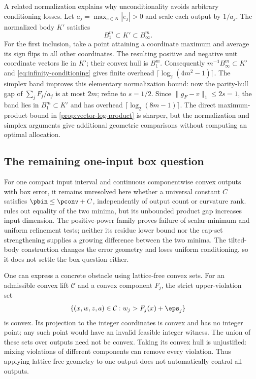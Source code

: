 A related normalization explains why unconditionality avoids arbitrary
conditioning losses. Let $a_j=\max_{e\in K}|e_j|>0$ and scale each
output by $1/a_j$. The normalized body $K'$ satisfies
\[
 B_1^m\subset K'\subset B_\infty^m.
\]
For the first inclusion, take a point attaining a coordinate maximum and
average its sign flips in all other coordinates. The resulting positive
and negative unit coordinate vectors lie in $K'$; their convex hull
is $B_1^m$. Consequently $m^{-1}B_\infty^m\subset K'$ and
\eqref{eq:infinity-conditioning} gives finite overhead
$\lceil\log_2(4m^2-1)\rceil$. The simplex band improves this elementary
normalization bound: now the parity-hull gap of $\sum_jF_j/a_j$ is at
most $2m$; refine to $s=1/2$. Since
$\|g_F-v\|_1\le2s=1$, the band lies in $B_1^m\subset K'$ and
has overhead $\lceil\log_2(8m-1)\rceil$.
The direct maximum-product bound in \cref{prop:vector-log-product}
is sharper, but the normalization and simplex arguments give additional
geometric comparisons without computing an optimal allocation.

\subsection{The remaining one-input box question}\label{subsec:one-input-open}

For one compact input interval and continuous componentwise convex outputs
with box error, it remains unresolved here whether a universal constant
$C$ satisfies $\pbin\le\pconv+C$, independently of output count or
curvature rank.  rules out equality of the two
minima, but its unbounded product gap increases input dimension.
The positive-power family proves failure of scalar-minimum and uniform
refinement tests; neither its residue lower bound nor the cap-set
strengthening supplies a growing difference between the two minima.
The tilted-body construction changes the error geometry and loses
uniform conditioning, so it does not settle the box question either.

One can express a concrete obstacle using lattice-free convex sets.
For an admissible convex lift $\mathcal C$ and a convex component $F_j$,
the strict upper-violation set
\[
 \{(x,w,z,a)\in\mathcal C:w_j>F_j(x)+\eps_j\}
\]
is convex. Its projection to the integer coordinates is convex and has
no integer point; any such point would have an invalid feasible integer
witness. The union of these sets over outputs need not be convex.
Taking its convex hull is unjustified: mixing violations of different
components can remove every violation. Thus applying lattice-free
geometry to one output does not automatically control all outputs.

